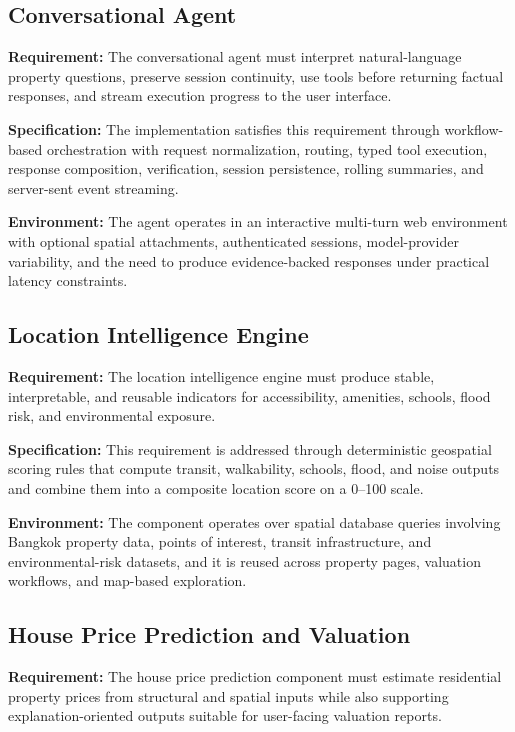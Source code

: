 \subsection{Conversational Agent}

\textbf{Requirement:} The conversational agent must interpret natural-language property questions, preserve session continuity, use tools before returning factual responses, and stream execution progress to the user interface.

\textbf{Specification:} The implementation satisfies this requirement through workflow-based orchestration with request normalization, routing, typed tool execution, response composition, verification, session persistence, rolling summaries, and server-sent event streaming.

\textbf{Environment:} The agent operates in an interactive multi-turn web environment with optional spatial attachments, authenticated sessions, model-provider variability, and the need to produce evidence-backed responses under practical latency constraints.

\subsection{Location Intelligence Engine}

\textbf{Requirement:} The location intelligence engine must produce stable, interpretable, and reusable indicators for accessibility, amenities, schools, flood risk, and environmental exposure.

\textbf{Specification:} This requirement is addressed through deterministic geospatial scoring rules that compute transit, walkability, schools, flood, and noise outputs and combine them into a composite location score on a 0--100 scale.

\textbf{Environment:} The component operates over spatial database queries involving Bangkok property data, points of interest, transit infrastructure, and environmental-risk datasets, and it is reused across property pages, valuation workflows, and map-based exploration.

\subsection{House Price Prediction and Valuation}

\textbf{Requirement:} The house price prediction component must estimate residential property prices from structural and spatial inputs while also supporting explanation-oriented outputs suitable for user-facing valuation reports.

